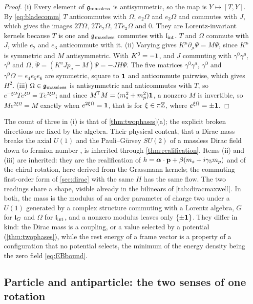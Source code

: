\begin{proof}
(i) Every element of $\mathfrak g_{\rm massless}$ is antisymmetric, so the map is $Y\mapsto[T,Y]$. By \eqref{eq:bladecomm} $T$ anticommutes
with $\Omega$, $e_2\Omega$ and $e_3\Omega$ and commutes with $J$, which gives the images $2T\Omega$, $2Te_2\Omega$, $2Te_3\Omega$ and $0$. They are
Lorentz-invariant kernels because $T$ is one and $\mathfrak g_{\rm massless}$ commutes with $\mathfrak l_{\rm int}$. $T$ and $\Omega$ commute with $J$, while
$e_2$ and $e_3$ anticommute with it. (ii) Varying gives $K^\mu\partial_\mu\Psi=M\Psi$, since $K^\mu$ is symmetric and $M$ antisymmetric. With
$K^0=-\mathbf 1$, and $J$ commuting with $\gamma^0\gamma^a$, $\gamma^0$ and $\Omega$, $\dot\Psi=(K^aJp_a-M)\Psi=-JH\Psi$. The five matrices
$\gamma^0\gamma^a$, $\gamma^0$ and $\gamma^0\Omega=e_4e_5e_6$ are symmetric, square to $\mathbf 1$ and anticommute pairwise, which gives $H^2$.
(iii) $\Omega\in\mathfrak g_{\rm massless}$ is antisymmetric and anticommutes with $T$, so $e^{-\xi\Omega}Te^{\xi\Omega}=Te^{2\xi\Omega}$; and
since $M^{\!\top}M=(m_s^2+m_p^2)\mathbf 1$, a nonzero $M$ is invertible, so $Me^{2\xi\Omega}=M$ exactly when $e^{2\xi\Omega}=\mathbf 1$, that is for $\xi\in\pi\mathbb{Z}$, where $e^{\xi\Omega}=\pm\mathbf 1$.
\end{proof}

The count of three in (i) is that of \cref{thm:twophases}(a); the explicit broken directions are fixed by the algebra. Their physical
content, that a Dirac mass breaks the axial $U(1)$ and the Pauli--G\"ursey $SU(2)$ of a massless Dirac field down to fermion number
\cite{Pauli57,Gursey58}, is inherited through \cref{thm:realification}. Items (ii) and (iii) are inherited: they are the realification of
$h=\boldsymbol\alpha\cdot\mathbf p+\beta(m_s+i\gamma_5m_p)$ and of the chiral rotation, here derived from the Grassmann kernels; the commuting
first-order form of \cref{sec:dirac} with the same $H$ has the same flow. The two readings share a shape, visible already in the bilinears of \cref{tab:diracmaxwell}. In both, the mass is the
modulus of an order parameter of charge two under a $U(1)$ generated by a complex structure commuting with a Lorentz algebra, $G$ for
$\mathfrak l_G$ and $\Omega$ for $\mathfrak l_{\rm int}$, and a nonzero modulus leaves only $\{\pm\mathbf 1\}$. They differ in kind: the Dirac mass is a coupling, or a value
selected by a potential (\cref{thm:twophases}), while the rest energy of a frame vector is a property of a configuration that no
potential selects, the minimum of the energy density being the zero field \eqref{eq:EBbound}.

\subsection{Particle and antiparticle: the two senses of one rotation}
\label{sec:masssenses}

